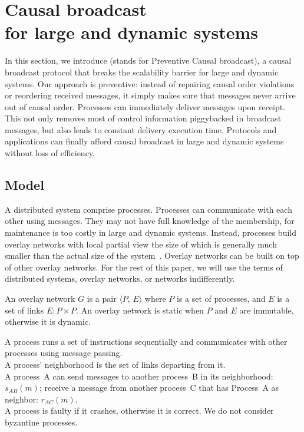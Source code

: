 
\section{Causal broadcast\\for large and dynamic systems}
\label{sec:proposal}

In this section, we introduce \CBROADCAST (stands for Preventive Causal
broadcast), a causal broadcast protocol that breaks the scalability barrier for
large and dynamic systems.  Our approach is preventive: instead of repairing
causal order violations or reordering received messages, it simply makes sure
that messages never arrive out of causal order. Processes can immediately
deliver messages upon receipt. This not only removes most of control information
piggybacked in broadcast messages, but also leads to constant delivery execution
time. Protocols and applications can finally afford causal broadcast in large
and dynamic systems without loss of efficiency.

\subsection{Model}

A distributed system comprise processes. Processes can communicate with each
other using messages. They may not have full knowledge of the membership, for
maintenance is too costly in large and dynamic systems. Instead, processes build
overlay networks with local partial view the size of which is generally much
smaller than the actual size of the
system~\cite{bertier-d2ht,jelasity2007gossip,jelasity2009tman}. Overlay networks
can be built on top of other overlay networks.  For the rest of this paper, we
will use the terms of distributed systems, overlay networks, or networks
indifferently.

\begin{definition}
  An overlay network $G$ is a pair $\langle P,\, E\rangle$ where $P$ is a set of
  processes, and $E$ is a set of links $E: P\times P$. An overlay network is
  static when $P$ and $E$ are immutable, otherwise it
  is dynamic.
\end{definition}

\begin{definition}[Process]
  A process runs a set of instructions sequentially and communicates
  with other processes using message passing. \\
  A process' neighborhood is the set of links departing from it. \\
  A process~A can send messages to another process~B in its neighborhood:
  $s_{AB}(m)$; receive a message from another process~C that has Process~A as
  neighbor:
  $r_{AC}(m)$. \\
  A process is faulty if it crashes, otherwise it is correct. We do not consider
  byzantine processes.
\end{definition}


